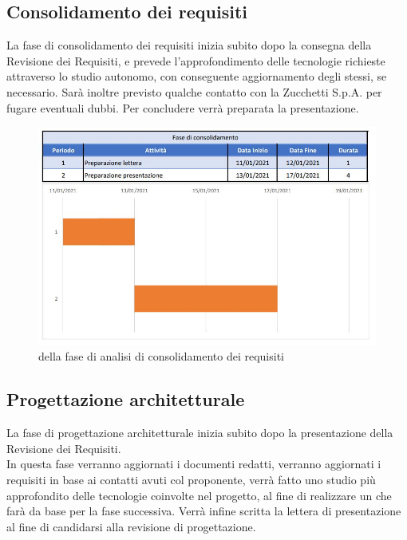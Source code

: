 \documentclass[../piano_di_progetto.tex]{subfiles}
\begin{document}
\subsection{Consolidamento dei requisiti}%
\label{sub:cons_req}
La fase di consolidamento dei requisiti inizia subito dopo la consegna della Revisione dei Requisiti, e prevede l’approfondimento delle tecnologie richieste attraverso lo studio autonomo, con conseguente aggiornamento degli stessi, se necessario. Sarà inoltre previsto qualche contatto con la Zucchetti S.p.A. per fugare eventuali dubbi. Per concludere verrà preparata la presentazione. 
\begin{figure}[H]
\centering
\includegraphics[width=12cm]{img/fase_consolid}
\caption{  della fase di analisi di consolidamento dei requisiti}
\end{figure}

\subsection{Progettazione architetturale}%
\label{sub:prog_arc}
La fase di progettazione architetturale inizia subito dopo la presentazione della Revisione dei Requisiti.\\
In questa fase verranno aggiornati i documenti redatti, verranno aggiornati i requisiti in base ai contatti avuti col proponente, verrà fatto uno studio più approfondito delle tecnologie coinvolte nel progetto, al fine di realizzare un  che farà da base per la fase successiva. Verrà infine scritta la lettera di presentazione al fine di candidarsi alla revisione di progettazione.
\end{document}
